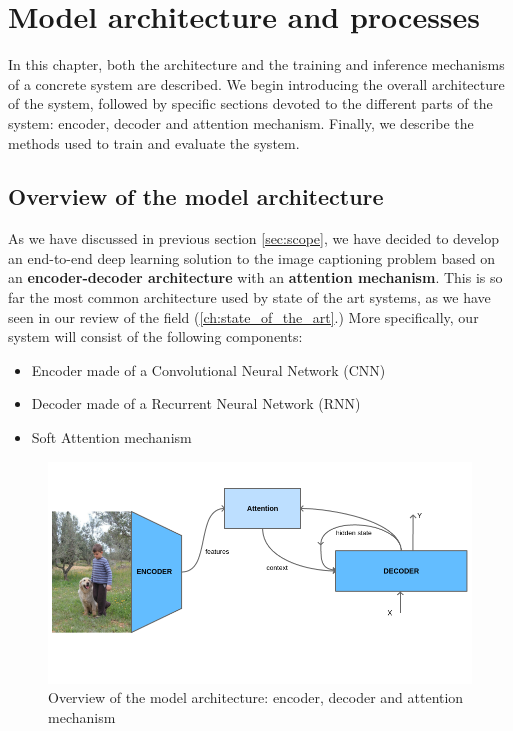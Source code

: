 \chapter{Model architecture and processes}
\label{ch:model}

In this chapter, both the architecture and the training and inference mechanisms of a concrete system are described. We begin introducing the overall architecture of the system, followed by specific sections devoted to the different parts of the system: encoder, decoder and attention mechanism. Finally, we describe the methods used to train and evaluate the system.

\section{Overview of the model architecture}

As we have discussed in previous section \cref{sec:scope}, we have decided to develop an end-to-end deep learning solution to the image captioning problem based on an \textbf{encoder-decoder architecture} with an \textbf{attention mechanism}. This is so far the most common architecture used by state of the art systems, as we have seen in our review of the field (\cref{ch:state_of_the_art}.) More specifically, our system will consist of the following components:

\begin{itemize}
    \item Encoder made of a Convolutional Neural Network (CNN)
    \item Decoder made of a Recurrent Neural Network (RNN)
    \item Soft Attention mechanism
\end{itemize}

\begin{figure}[hpt]
	\centering
	\includegraphics[scale=0.5]{images/ch4/overview.png}
	\caption{Overview of the model architecture: encoder, decoder and attention mechanism}
	\label{fig:overview}
\end{figure}

